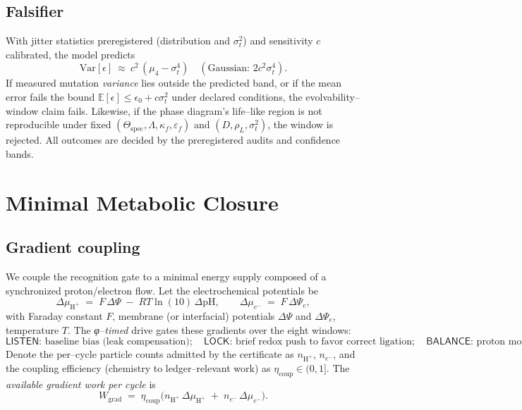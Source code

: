 \documentclass[11pt]{article}
\begin{document}
\subsection{Falsifier}\label{sec:evo-falsifier}
With jitter statistics preregistered (distribution and $\sigma_t^2$) and sensitivity $c$ calibrated, the model predicts
\[
\mathrm{Var}[\epsilon]\ \approx\ c^2\,(\mu_4-\sigma_t^4)\quad(\text{Gaussian: }2c^2\sigma_t^4).
\]
If measured mutation \emph{variance} lies outside the predicted band, or if the mean error fails the bound $\mathbb{E}[\epsilon]\le \epsilon_0+c\sigma_t^2$ under declared conditions, the evolvability–window claim fails. Likewise, if the phase diagram’s life–like region is not reproducible under fixed $(\Theta_{\mathrm{spec}},\Lambda,\kappa_f,\varepsilon_f)$ and $(D,\rho_L,\sigma_t^2)$, the window is rejected. All outcomes are decided by the preregistered audits and confidence bands.

\section{Minimal Metabolic Closure}\label{sec:closure}

\subsection{Gradient coupling}\label{sec:gradient}
We couple the recognition gate to a minimal energy supply composed of a synchronized proton/electron flow. Let the electrochemical potentials be
\[
\Delta \mu_{\mathrm{H}^+}\;=\;F\,\Delta\Psi\;-\;RT\ln(10)\,\Delta\mathrm{pH},\qquad
\Delta \mu_{e^-}\;=\;F\,\Delta\Psi_e,
\]
with Faraday constant $F$, membrane (or interfacial) potentials $\Delta\Psi$ and $\Delta\Psi_e$, temperature $T$. The \emph{φ–timed} drive gates these gradients over the eight windows:
\[
\textsf{LISTEN: } \text{baseline bias (leak compensation)};\quad
\textsf{LOCK: } \text{brief redox push to favor correct ligation};\quad
\textsf{BALANCE: } \text{proton motive export of waste}.
\]
Denote the per–cycle particle counts admitted by the certificate as $n_{\mathrm{H}^+}$, $n_{e^-}$, and the coupling efficiency (chemistry to ledger–relevant work) as $\eta_{\mathrm{coup}}\in(0,1]$. The \emph{available gradient work per cycle} is
\begin{equation}\label{eq:grad-work}
W_{\mathrm{grad}}\;=\;\eta_{\mathrm{coup}}\Big(n_{\mathrm{H}^+}\,\Delta \mu_{\mathrm{H}^+}\;+\;n_{e^-}\,\Delta \mu_{e^-}\Big).
\end{equation}
\end{document}
